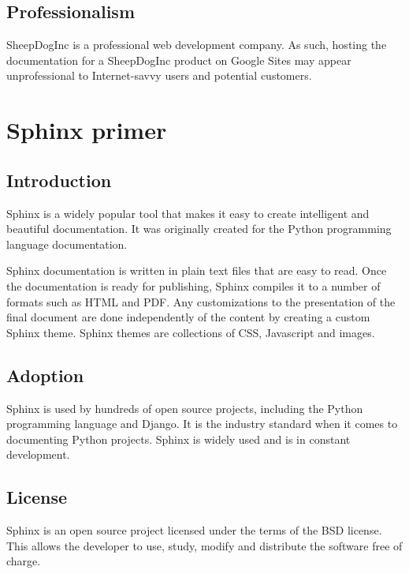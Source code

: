 \documentclass[letterpaper]{report}
\begin{document}
    \subsection*{Professionalism}

        SheepDogInc is a professional web development company. As such, hosting
        the documentation for a SheepDogInc product on Google Sites may appear
        unprofessional to Internet-savvy users and potential customers.

\section*{Sphinx primer}

    \subsection*{Introduction}

        Sphinx is a widely popular tool that makes it easy to create
        intelligent and beautiful documentation. It was originally created for
        the Python programming language documentation.

        Sphinx documentation is written in plain text files that are easy to
        read. Once the documentation is ready for publishing, Sphinx compiles
        it to a number of formats such as HTML and PDF. Any customizations to
        the presentation of the final document are done independently of the
        content by creating a custom Sphinx theme. Sphinx themes are
        collections of CSS, Javascript and images.

    \subsection*{Adoption}

        Sphinx is used by hundreds of open source projects, including the
        Python programming language and  Django. It is the industry standard
        when it comes to documenting Python projects. Sphinx is widely used and
        is in constant development.

    \subsection*{License}

        Sphinx is an open source project licensed under the terms of the BSD
        license. This allows the developer to use, study, modify and distribute
        the software free of charge. 
\end{document}
